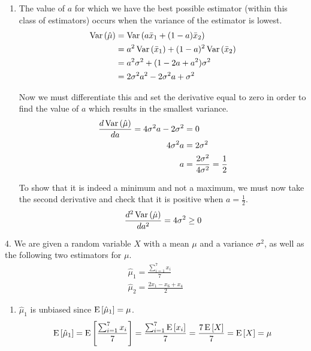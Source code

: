 \documentclass[fleqn]{article}
\begin{document}
\begin{answers}
\begin{enumerate}
			\item %
				The value of \(a\) for which we have the best possible estimator (within this class of estimators) occurs when the variance of the estimator is lowest.
				\begin{align*}
					\operatorname{Var}\left(\hat{\mu}\right) & = \operatorname{Var}\left(a\bar{x}_1 + (1-a)\bar{x}_2\right) \\
					                & = a^2 \operatorname{Var}\left(\bar{x}_1\right) + (1-a)^2 \operatorname{Var}\left(\bar{x}_2\right) \\
					                & = a^2 \sigma^2 + (1-2a+a^2) \sigma^2 \\
					                & = 2 \sigma^2 a^2 - 2\sigma^2 a + \sigma^2
				\end{align*}

				Now we must differentiate this and set the derivative equal to zero in order to find the value of \(a\) which results in the smallest variance.
				\begin{align*}
					\frac{d\operatorname{Var}\left(\hat{\mu}\right)}{da} = 4 \sigma^2 a - 2 \sigma^2 & = 0 \\
					4 \sigma^2 a                                            & =  2 \sigma^2 \\
					a                                                       & =  \frac{2\sigma^2}{4\sigma^2} = \frac{1}{2} \\
				\end{align*}

				To show that it is indeed a minimum and not a maximum, we must now take the second derivative and check that it is positive when \(a = \frac{1}{2}\).
				\begin{align*}
					\frac{d^2\operatorname{Var}\left(\hat{\mu}\right)}{da^2} = 4 \sigma^2 \geq 0
				\end{align*}
		\end{enumerate}

	\item[4.]
		We are given a random variable \(X\) with a mean \(\mu\) and a variance \(\sigma^2\), as well as the following two estimators for \(\mu\).
		\begin{gather*}
			\hat{\mu}_1 = \frac{\sum_{i=1}^7 x_i}{7} \\
			\hat{\mu}_2 = \frac{2x_1 - x_6 + x_4}{2}
		\end{gather*}

		\begin{enumerate}
			\item %
				\(\hat{\mu}_1\) is unbiased since \(\operatorname{E}\left[\hat{\mu}_1\right] = \mu\).
				\[\operatorname{E}\left[\hat{\mu}_1\right] = \operatorname{E}\left[\frac{\sum_{i=1}^7 x_i}{7}\right] = \frac{\sum_{i=1}^7 \operatorname{E}\left[x_i\right]}{7} = \frac{7 \operatorname{E}\left[X\right]}{7} = \operatorname{E}\left[X\right] = \mu\]


\end{enumerate}
\end{answers}
\end{document}
